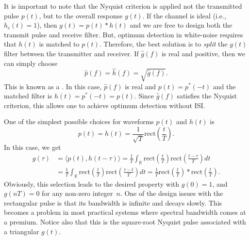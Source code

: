 It is important to note that the Nyquist criterion is applied not the transmitted pulse $p(t)$, but to the overall response $g(t)$.
If the channel is ideal (i.e., $h_c (t) = 1$), then $g(t) = p(t) * h (t)$ and we are free to design both the transmit pulse and receive filter.
But, optimum detection in white-noise requires that $h (t)$ is matched to $p(t)$.
Therefore, the best solution is to \emph{split} the $g(t)$ filter between the transmitter and receiver.
If $\hat{g}(f)$ is real and positive, then we can simply choose
\[ \hat{p}(f) = \hat{h} (f) = \sqrt{\hat{g}(f)}. \]
This is known as a .
In this case, $\hat{p}(f)$ is real and $p(t) = p^* (-t)$ and the matched filter is $h(t) = p^*(-t) = p(t)$.
Since $\hat{g}(f)$ satisfies the Nyquist criterion, this allows one to achieve optimum detection without ISI.

\begin{example}
One of the simplest possible choices for waveforms $p(t)$ and $h (t)$ is
\begin{equation*}
p(t) = h (t) = \frac{1}{\sqrt{T}} \mathrm{rect} \left( \frac{t}{T} \right) .
\end{equation*}
In this case, we get
\begin{equation*}
\begin{split}
g(\tau) &= \langle p(t), h (t-\tau) \rangle
= \frac{1}{T} \int_{\mathbb{R}} \mathrm{rect} \left( \frac{t}{T} \right)
\mathrm{rect} \left( \frac{t - \tau}{T} \right) dt \\
&= \frac{1}{T} \int_{\mathbb{R}} \mathrm{rect} \left( \frac{t}{T} \right)
\mathrm{rect} \left( \frac{\tau - t}{T} \right) dt
= \frac{1}{T} \mathrm{rect} \left( \frac{t}{T} \right)
\ast \mathrm{rect}\left( \frac{t}{T} \right) .
\end{split}
\end{equation*}
Obviously, this selection leads to the desired property with $g(0) = 1$, and $g(nT) = 0$ for any non-zero integer~$n$.
One of the design issues with the rectangular pulse is that its bandwidth is infinite and decays slowly.
This becomes a problem in most practical systems where spectral bandwidth comes at a premium.
Notice also that this is the square-root Nyquist pulse associated with a triangular $g(t)$.
\end{example}

